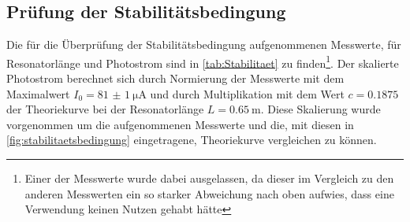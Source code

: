 \subsection{Prüfung der Stabilitätsbedingung}\label{sec:Stabilitaetsbedingung}
	Die für die Überprüfung der Stabilitätsbedingung aufgenommenen Messwerte, für Resonatorlänge und Photostrom
	sind in \cref{tab:Stabilitaet} zu finden\footnote{Einer der Messwerte wurde dabei ausgelassen, da dieser im Vergleich zu den anderen Messwerten ein so starker  Abweichung nach oben aufwies, dass eine Verwendung keinen Nutzen gehabt hätte}. Der skalierte Photostrom berechnet sich durch Normierung der Messwerte
	mit dem Maximalwert $I_0 = \SI{81(1)}{\micro\ampere}$ und durch Multiplikation mit dem Wert $c = \num{0.1875}$ der Theoriekurve 
	bei der Resonatorlänge $L = \SI{0.65}{\meter}$. Diese Skalierung wurde vorgenommen um die aufgenommenen Messwerte 
	und die, mit diesen in \cref{fig:stabilitaetsbedingung} eingetragene, Theoriekurve vergleichen zu können.
	
	
	
	\FloatBarrier